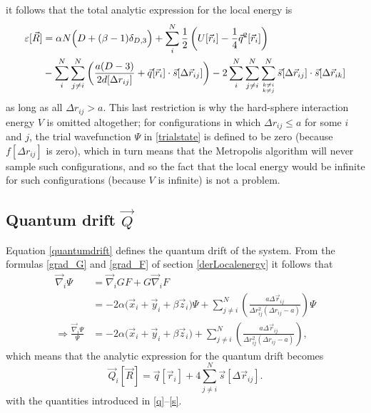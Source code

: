 \documentclass[a4paper,8pt]{article}
\begin{document}
it follows that the total analytic expression for the local energy is
\begin{align}
\varepsilon[\vec{R}] &= \alpha N\Big(D+(\beta-1)\delta_{D,3}\Big) + \sum\limits_i^N \frac{1}{2}\left( U[\vec{r}_i] - \frac{1}{4}\vec{q}^2[\vec{r}_i] \right) \nonumber\\
&- \sum\limits_i^N \sum\limits_{j \neq i}^N \left( \frac{a(D-3)}{2d[\Delta{r}_{ij}]} + \vec{q}[\vec{r}_i] \cdot \vec{s}[\Delta\vec{r}_{ij}] \right) - 2\sum\limits_i^N \sum\limits_{j \neq i}^N \sum\limits_{{k \neq i}\atop{k \neq j}}^N \vec{s}[\Delta\vec{r}_{ij}] \cdot \vec{s}[\Delta\vec{r}_{ik}] \label{compLocalenergy}
\end{align}
as long as all $\Delta r_{ij} > a$. This last restriction is why the hard-sphere interaction energy $V$ is omitted altogether; for configurations in which $\Delta r_{ij} \leq a$ for some $i$ and $j$, the trial wavefunction $\Psi$ in \eqref{trialstate} is defined to be zero (because $f[\Delta r_{ij}]$ is zero), which in turn means that the Metropolis algorithm will never sample such configurations, and so the fact that the local energy would be infinite for such configurations (because $V$ is infinite) is not a problem.


\subsection{Quantum drift $\vec{Q}$}\label{derQuantumdrift}
Equation \eqref{quantumdrift} defines the quantum drift of the system. From the formulas \eqref{grad_G} and \eqref{grad_F} of section \ref{derLocalenergy} it follows that
\begin{align}
\vec{\nabla}_i\Psi &= \vec{\nabla}_i G F + G \vec{\nabla}_i F \nonumber\\
&= -2\alpha\Big(\vec{x}_i+\vec{y}_i+\beta\vec{z}_i\Big)\Psi + \sum\limits_{j \neq i}^N \left(\frac{a\Delta\vec{r}_{ij}}{\Delta{r}_{ij}^2(\Delta{r}_{ij}-a)}\right) \Psi \nonumber\\
\Longrightarrow \frac{\vec{\nabla}_i\Psi}{\Psi} &= -2\alpha\Big(\vec{x}_i+\vec{y}_i+\beta\vec{z}_i\Big) + \sum\limits_{j \neq i}^N \left(\frac{a\Delta\vec{r}_{ij}}{\Delta{r}_{ij}^2(\Delta{r}_{ij}-a)}\right),
\end{align}
which means that the analytic expression for the quantum drift becomes
\begin{equation}
\vec{Q}_i[\vec{R}] = \vec{q}[\vec{r}_i] + 4\sum\limits_{j \neq i}^N \vec{s}[\Delta\vec{r}_{ij}]. \label{compQD}
\end{equation}
with the quantities introduced in \eqref{q}–\eqref{s}.
\end{document}

